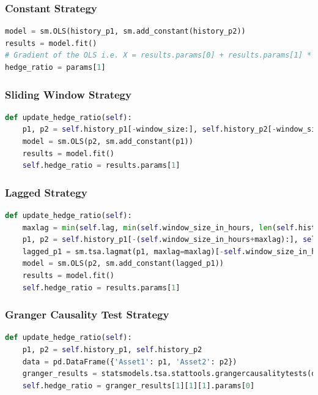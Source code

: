 \subsubsection{Constant Strategy}
\begin{lstlisting}[language=Python, caption={Calculation of the hedge ratio of the Constant Strategy},captionpos=b]
model = sm.OLS(history_p1, sm.add_constant(history_p2))
results = model.fit()
# Gradient of the OLS i.e. X = results.params[0] + results.params[1] * 'p2_token1_price'
hedge_ratio = params[1]
\end{lstlisting}

\subsubsection{Sliding Window Strategy}
\begin{lstlisting}[language=Python, caption={Calculation of the hedge ratio in \texttt{update\_hedge\_ratio} of the Sliding Window Strategy},captionpos=b]
def update_hedge_ratio(self):
    p1, p2 = self.history_p1[-window_size:], self.history_p2[-window_size:]
    model = sm.OLS(p2, sm.add_constant(p1))
    results = model.fit()
    self.hedge_ratio = results.params[1]
\end{lstlisting}

\subsubsection{Lagged Strategy}
\begin{lstlisting}[language=Python, caption={Calculation of the hedge ratio in \texttt{update\_hedge\_ratio} of the Lagged Strategy},captionpos=b]
def update_hedge_ratio(self):
    maxlag = min(self.lag, min(self.window_size_in_hours, len(self.history_p1))-1)
    p1, p2 = self.history_p1[-(self.window_size_in_hours+maxlag):], self.history_p2[-self.window_size_in_hours:]
    lagged_p1 = sm.tsa.lagmat(p1, maxlag=maxlag)[-self.window_size_in_hours:]
    model = sm.OLS(p2, sm.add_constant(lagged_p1))
    results = model.fit()
    self.hedge_ratio = results.params[1]
\end{lstlisting}

\subsubsection{Granger Causality Test Strategy}
\begin{lstlisting}[language=Python, caption={Calculation of the hedge ratio in \texttt{update\_hedge\_ratio} of the Granger Causality Test Strategy},captionpos=b]
def update_hedge_ratio(self):
    p1, p2 = self.history_p1, self.history_p2
    data = pd.DataFrame({'Asset1': p1, 'Asset2': p2})
    granger_results = statsmodels.tsa.stattools.grangercausalitytests(data, maxlag=[1], verbose=False)
    self.hedge_ratio = granger_results[1][1][1].params[0]
\end{lstlisting}


